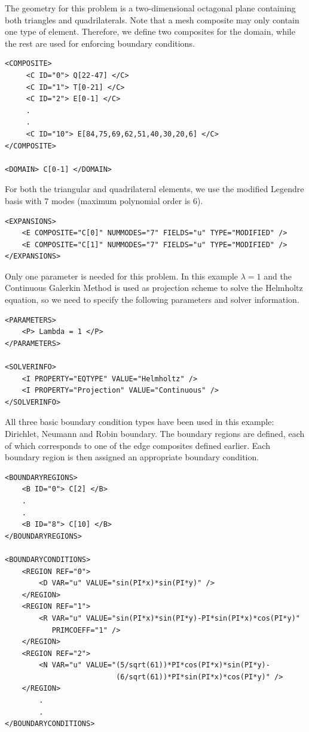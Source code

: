The geometry for this problem is a two-dimensional octagonal plane containing
both triangles and quadrilaterals. Note that a mesh composite may only contain
one type of element. Therefore, we define two composites for the domain, while
the rest are used for enforcing boundary conditions.
\begin{lstlisting}[style=XMLStyle]
<COMPOSITE>
     <C ID="0"> Q[22-47] </C>
     <C ID="1"> T[0-21] </C>
     <C ID="2"> E[0-1] </C>
     .
     .
     <C ID="10"> E[84,75,69,62,51,40,30,20,6] </C>
</COMPOSITE>

<DOMAIN> C[0-1] </DOMAIN>
\end{lstlisting}

For both the triangular and quadrilateral elements, we use the modified Legendre
basis with $7$ modes (maximum polynomial order is $6$).
\begin{lstlisting}[style=XMLStyle]
<EXPANSIONS>
    <E COMPOSITE="C[0]" NUMMODES="7" FIELDS="u" TYPE="MODIFIED" />
    <E COMPOSITE="C[1]" NUMMODES="7" FIELDS="u" TYPE="MODIFIED" />
</EXPANSIONS>
\end{lstlisting}

Only one parameter is needed for this problem. In this example $\lambda = 1$ and
the Continuous Galerkin Method is used as projection scheme to solve the 
Helmholtz equation, so we need to specify the following parameters and solver
information.
\begin{lstlisting}[style=XMLStyle]
<PARAMETERS>
    <P> Lambda = 1 </P>
</PARAMETERS>

<SOLVERINFO>
    <I PROPERTY="EQTYPE" VALUE="Helmholtz" />
    <I PROPERTY="Projection" VALUE="Continuous" />
</SOLVERINFO>
\end{lstlisting}

All three basic boundary condition types have been used in this example:
Dirichlet, Neumann and Robin boundary. The boundary regions are defined, each of
which corresponds to one of the edge composites defined earlier. Each boundary
region is then assigned an appropriate boundary condition.
\begin{lstlisting}[style=XMLStyle]
<BOUNDARYREGIONS>
    <B ID="0"> C[2] </B>
    .
    .
    <B ID="8"> C[10] </B>
</BOUNDARYREGIONS>

<BOUNDARYCONDITIONS>
    <REGION REF="0">
        <D VAR="u" VALUE="sin(PI*x)*sin(PI*y)" />
    </REGION>
    <REGION REF="1">
        <R VAR="u" VALUE="sin(PI*x)*sin(PI*y)-PI*sin(PI*x)*cos(PI*y)" 
           PRIMCOEFF="1" />
    </REGION>
    <REGION REF="2">
        <N VAR="u" VALUE="(5/sqrt(61))*PI*cos(PI*x)*sin(PI*y)-
                          (6/sqrt(61))*PI*sin(PI*x)*cos(PI*y)" />
    </REGION>
        .
        .
</BOUNDARYCONDITIONS>
\end{lstlisting}

